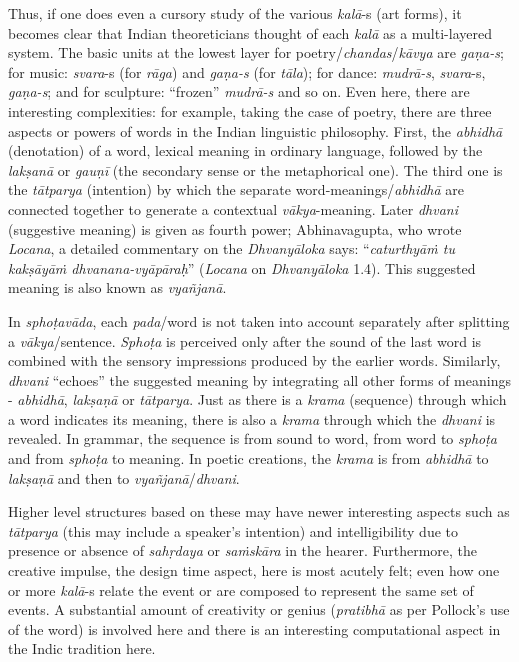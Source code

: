 Thus, if one does even a cursory study of the various \textsl{kalā}-s (art forms), it becomes clear that Indian theoreticians thought of each \textsl{kalā} as a multi-layered system. The basic units at the lowest layer for poetry/\textsl{chandas}/\textsl{kāvya} are \textsl{gaṇa-s}; for music: \textsl{svara}-s (for \textsl{rāga}) and \textsl{gaṇa-s} (for \textsl{tāla}); for dance: \textsl{mudrā-s}, \textsl{svara}-s, \textsl{gaṇa-s}; and for sculpture: “frozen” \textsl{mudrā-s} and so on. Even here, there are interesting complexities: for example, taking the case of poetry, there are three aspects or powers of words in the Indian linguistic philosophy. First, the \textsl{abhidhā} (denotation) of a word, lexical meaning in ordinary language, followed by the \textsl{lakṣanā} or \textsl{gauṇī} (the secondary sense or the metaphorical one). The third one is the \textsl{tātparya} (intention) by which the separate word-meanings/\textsl{abhidhā} are connected together to generate a contextual \textsl{vākya}-meaning. Later \textsl{dhvani} (suggestive meaning) is given as fourth power; Abhinavagupta, who wrote \textsl{Locana}, a detailed commentary on the \textsl{Dhvanyāloka} says: “\textsl{caturthyāṁ tu kakṣāyāṁ dhvanana-vyāpāraḥ}” (\textsl{Locana} on \textsl{Dhvanyāloka} 1.4). This suggested meaning is also known as \textsl{vyañjanā}.

In \textsl{sphoṭavāda}, each \textsl{pada}/word is not taken into account separately after splitting a \textsl{vākya}/sentence. \textsl{Sphoṭa} is perceived only after the sound of the last word is combined with the sensory impressions produced by the earlier words. Similarly, \textsl{dhvani} “echoes” the suggested meaning by integrating all other forms of meanings - \textsl{abhidhā}, \textsl{lakṣaṇā} or \textsl{tātparya}. Just as there is a \textsl{krama} (sequence) through which a word indicates its meaning, there is also a \textsl{krama} through which the \textsl{dhvani} is revealed. In grammar, the sequence is from sound to word, from word to \textsl{sphoṭa} and from \textsl{sphoṭa} to meaning. In poetic creations, the \textsl{krama} is from \textsl{abhidhā} to \textsl{lakṣaṇā} and then to \textsl{vyañjanā}/\textsl{dhvani}.

Higher level structures based on these may have newer interesting aspects such as \textsl{tātparya} (this may include a speaker’s intention) and intelligibility due to presence or absence of \textsl{sahṛdaya} or \textsl{saṁskāra} in the hearer. Furthermore, the creative impulse, the design time aspect, here is most acutely felt; even how one or more \textsl{kalā}-s relate the event or are composed to represent the same set of events. A substantial amount of creativity or genius (\textsl{pratibhā} as per Pollock’s use of the word) is involved here and there is an interesting computational aspect in the Indic tradition here.

